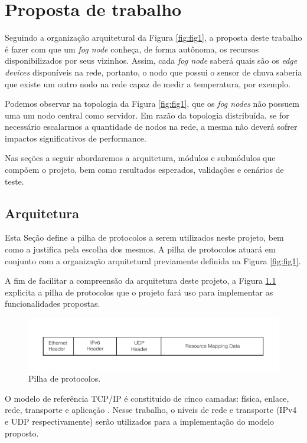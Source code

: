 \chapter{\label{chap:chap3} Proposta de trabalho}

Seguindo a organização arquitetural da Figura \ref{fig:fig1}, a proposta deste trabalho é fazer com que um \textit{fog node} conheça, de forma autônoma, os recursos disponibilizados por seus vizinhos.
Assim, cada \textit{fog node} saberá quais são os \textit{edge devices} disponíveis na rede, portanto,
o nodo que possui o sensor de chuva saberia que existe um outro nodo na rede capaz de medir a temperatura, por exemplo.


Podemos observar na topologia da Figura \ref{fig:fig1}, que os \textit{fog nodes} não possuem uma um nodo central como servidor.
Em razão da topologia distribuída, se for necessário escalarmos a quantidade de nodos na rede, a mesma não deverá sofrer impactos significativos de performance.

Nas seções a seguir abordaremos a arquitetura, módulos e submódulos que compõem o projeto, bem como resultados esperados, validações e cenários de teste. 

\section{Arquitetura}

Esta Seção define a pilha de protocolos a serem utilizados neste projeto, bem como a justifica pela escolha dos mesmos.
A pilha de protocolos atuará em conjunto com a organização arquitetural previamente definida na Figura \ref{fig:fig1}.

A fim de facilitar a compreensão da arquitetura deste projeto, a Figura \ref{fig:fig2} explicita a pilha de protocolos que o projeto fará uso para implementar as funcionalidades propostas.

\begin{figure}[htb!]
    \centering\includegraphics[width=.5\textwidth]{fig2.pdf}
    \caption%
    {\label{fig:fig2} Pilha de protocolos.}
\end{figure}

O modelo de referência TCP/IP é constituido de cinco camadas: física, enlace, rede, transporte e aplicação \cite{tanenbaum2011redes}.
Nesse trabalho, o níveis de rede e transporte (IPv4 e UDP respectivamente) serão utilizados para a implementação do modelo proposto.

